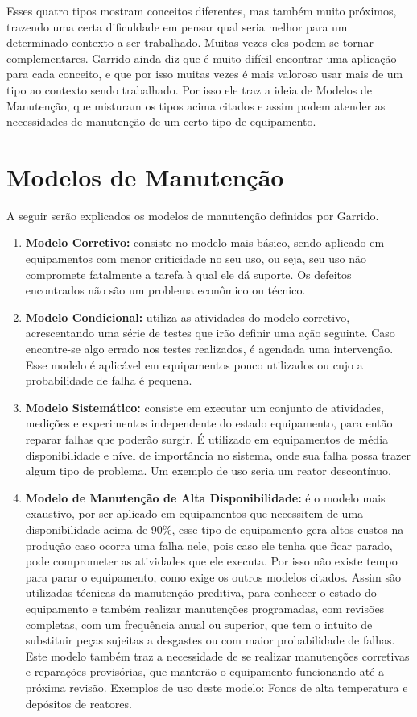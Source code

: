 Esses quatro tipos mostram conceitos diferentes, mas também muito próximos, trazendo uma certa dificuldade em pensar qual seria melhor para um determinado contexto a ser trabalhado. Muitas vezes eles podem se tornar complementares. Garrido \cite{garrido} ainda diz que é muito difícil encontrar uma aplicação para cada conceito, e que por isso muitas vezes é mais valoroso usar mais de um tipo ao contexto sendo trabalhado. Por isso ele traz a ideia de Modelos de Manutenção, que misturam os tipos acima citados e assim podem atender as necessidades de manutenção de um certo tipo de equipamento.

\section{Modelos de Manutenção}

A seguir serão explicados os modelos de manutenção definidos por Garrido.

\begin{enumerate}
	\item \textbf{Modelo Corretivo:} consiste no modelo mais básico, sendo aplicado em equipamentos com menor criticidade no seu uso, ou seja, seu uso não compromete fatalmente a tarefa à qual ele dá suporte. Os defeitos encontrados não são um problema econômico ou técnico. 
	\item \textbf{Modelo Condicional:} utiliza as atividades do modelo corretivo, acrescentando uma série de testes que irão definir uma ação seguinte. Caso encontre-se algo errado nos testes realizados, é agendada uma intervenção. Esse modelo é aplicável em equipamentos pouco utilizados ou cujo a probabilidade de falha é pequena.
	\item \textbf{Modelo Sistemático:} consiste em executar um conjunto de atividades, medições e experimentos independente do estado equipamento, para então reparar falhas que poderão surgir. É utilizado em equipamentos de média disponibilidade e nível de importância no sistema, onde sua falha possa trazer algum tipo de problema. Um exemplo de uso seria um reator descontínuo. 
	\item \textbf{Modelo de Manutenção de Alta Disponibilidade:} é o modelo mais exaustivo, por ser aplicado em equipamentos que necessitem de uma disponibilidade acima de 90\%, esse tipo de equipamento gera altos custos na produção caso ocorra uma falha nele, pois caso ele tenha que ficar parado, pode comprometer as atividades que ele executa. Por isso não existe tempo para parar o equipamento, como exige os outros modelos citados. Assim são utilizadas técnicas da manutenção preditiva, para conhecer o estado do equipamento e também realizar manutenções programadas, com revisões completas, com um frequência anual ou superior, que tem o intuito de substituir peças sujeitas a desgastes ou com maior probabilidade de falhas. 
	\\
	Este modelo também traz a necessidade de se realizar manutenções corretivas e reparações provisórias, que manterão o equipamento funcionando até a próxima revisão. Exemplos de uso deste modelo: Fonos de alta temperatura e depósitos de reatores.
\end{enumerate} 


